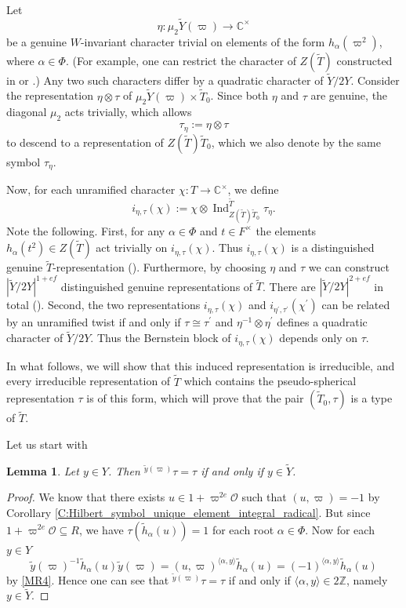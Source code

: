 \documentclass[10pt, letterpaper]{amsart}
\theoremstyle{plain}
\newtheorem{Lem}[equation]{Lemma}
\theoremstyle{definition}
\numberwithin{equation}{section}
\newcommand{\C}{\mathbb{C}}
\newcommand{\Z}{\mathbb{Z}}
\newcommand{\yt}{\tilde{y}}
\newcommand{\htt}{\tilde{h}}
\newcommand{\Tt}{\widetilde{T}}
\newcommand{\Yt}{\widetilde{Y}}
\newcommand{\Ind}{\operatorname{Ind}}
\newcommand{\Ocal}{\mathcal{O}}
\newcommand{\la}{\langle}
\newcommand{\ra}{\rangle}
\begin{document}
Let 
\[
\eta:\mu_2\Yt(\varpi)\longrightarrow \C^\times
\]
be a genuine $W$-invariant character trivial on elements of the form $h_{\alpha}(\varpi^{2})$, where $\alpha\in \Phi$. (For example, one can restrict the character of $Z(\Tt)$ constructed in \cite[page 118]{S04} or \cite[\S 7]{GG18}.) Any two such characters differ by a quadratic character of $\Yt/2Y$. Consider the representation $\eta\otimes\tau$ of $\mu_2\Yt(\varpi)\times\Tt_0$. Since both $\eta$ and $\tau$ are genuine, the diagonal $\mu_2$ acts trivially, which allows
\[
\tau_\eta:=\eta\otimes\tau
\]
to descend to a representation of $Z(\Tt)\Tt_0$, which we also denote by the same symbol $\tau_\eta$.

Now, for each unramified character $\chi:T\to\C^\times$, we define
\[
i_{\eta,\tau}(\chi):=\chi\otimes\Ind_{Z(\Tt)\Tt_0}^{\Tt}\tau_{\eta}.
\]
Note the following. First, for any $\alpha\in\Phi$ and $t\in F^{\times}$ the elements $h_{\alpha}(t^{2})\in Z(\Tt)$ act trivially on $i_{\eta,\tau}(\chi)$. Thus $i_{\eta,\tau}(\chi)$ is a distinguished genuine $\Tt$-representation (\cite[Section 6]{GG18}). Furthermore, by choosing $\eta$ and $\tau$ we can construct $|\Yt/2Y|^{1+ef}$ distinguished genuine representations of $\Tt$. There are $|\Yt/2Y|^{2+ef}$ in total (\cite[Theorem 6.6]{GG18}). Second, the two representations $i_{\eta,\tau}(\chi)$ and $i_{\eta^{\prime},\tau^{\prime}}(\chi^{\prime})$ can be related by an unramified twist if and only if $\tau\cong\tau^{\prime}$ and $\eta^{-1}\otimes \eta^{\prime}$ defines a quadratic character of $\Yt/2Y$. Thus the Bernstein block of $i_{\eta,\tau}(\chi)$ depends only on $\tau$.

In what follows, we will show that this induced representation is irreducible, and every irreducible representation of $\Tt$ which contains the pseudo-spherical representation $\tau$ is of this form, which will prove that the pair $(\Tt_0, \tau)$ is a type of $\Tt$.

Let us start with
\begin{Lem}\label{L:tau_twist}
Let $y\in Y$. Then $^{\yt(\varpi)}\tau=\tau$ if and only if $y\in\Yt$.
\end{Lem}
\begin{proof}
We know that there exists $u\in 1+\varpi^{2e}\Ocal$ such that $(u, \varpi)=-1$ by Corollary \ref{C:Hilbert_symbol_unique_element_integral_radical}. But since $1+\varpi^{2e}\Ocal\subseteq R$, we have $\tau(\htt_{\alpha}(u))=1$ for each root $\alpha\in\Phi$. Now for each $y\in Y$
\[
\yt(\varpi)^{-1}\htt_{\alpha}(u)\yt(\varpi)=(u, \varpi)^{\la \alpha, y\ra}\htt_{\alpha}(u)=(-1)^{\la \alpha, y\ra}\htt_{\alpha}(u)
\]
by \eqref{MR4}.
Hence one can see that $^{\yt(\varpi)}\tau=\tau$ if and only if $\la\alpha, y\ra\in 2\Z$, namely $y\in \Yt$.
\end{proof}
\end{document}
